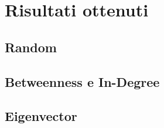 \section{Risultati ottenuti}

    \subsection{Random}
    
    \subsection{Betweenness e In-Degree}
    
    \subsection{Eigenvector}